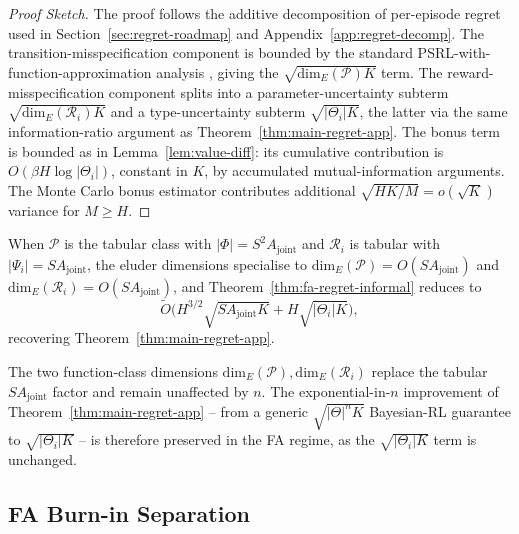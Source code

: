 \begin{proof}[Proof Sketch]
The proof follows the additive decomposition of per-episode regret used in Section~\ref{sec:regret-roadmap} and Appendix~\ref{app:regret-decomp}. The transition-misspecification component is bounded by the standard PSRL-with-function-approximation analysis \citep{osband2014model,russo2014learning}, giving the $\sqrt{\mathrm{dim}_E(\mathcal{P}) K}$ term. The reward-misspecification component splits into a parameter-uncertainty subterm $\sqrt{\mathrm{dim}_E(\mathcal{R}_i) K}$ and a type-uncertainty subterm $\sqrt{|\Theta_i| K}$, the latter via the same information-ratio argument as Theorem~\ref{thm:main-regret-app}. The bonus term is bounded as in Lemma~\ref{lem:value-diff}: its cumulative contribution is $O(\beta H \log|\Theta_i|)$, constant in $K$, by accumulated mutual-information arguments. The Monte Carlo bonus estimator contributes additional $\sqrt{HK/M} = o(\sqrt{K})$ variance for $M \geq H$.
\end{proof}

\begin{corollary}
\label{cor:fa-regret-tabular}
When $\mathcal{P}$ is the tabular class with $|\Phi| = S^2 A_{\mathrm{joint}}$ and $\mathcal{R}_i$ is tabular with $|\Psi_i| = S A_{\mathrm{joint}}$, the eluder dimensions specialise to $\mathrm{dim}_E(\mathcal{P}) = O(S A_{\mathrm{joint}})$ and $\mathrm{dim}_E(\mathcal{R}_i) = O(S A_{\mathrm{joint}})$, and Theorem~\ref{thm:fa-regret-informal} reduces to
\begin{equation}
\tilde O\big(H^{3/2}\sqrt{S A_{\mathrm{joint}} K} + H\sqrt{|\Theta_i| K}\big),
\end{equation}
recovering Theorem~\ref{thm:main-regret-app}.
\end{corollary}

The two function-class dimensions $\mathrm{dim}_E(\mathcal{P}), \mathrm{dim}_E(\mathcal{R}_i)$ replace the tabular $S A_{\mathrm{joint}}$ factor and remain unaffected by $n$. The exponential-in-$n$ improvement of Theorem~\ref{thm:main-regret-app} -- from a generic $\sqrt{|\Theta|^n K}$ Bayesian-RL guarantee to $\sqrt{|\Theta_i| K}$ -- is therefore preserved in the FA regime, as the $\sqrt{|\Theta_i| K}$ term is unchanged.

\subsection{FA Burn-in Separation}
\label{app:fa-burnin}

